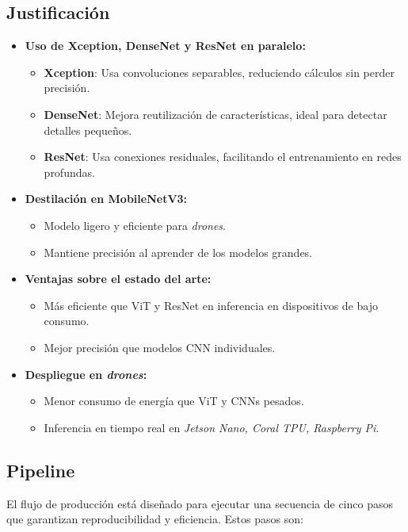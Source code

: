 \subsection{Justificación}

\begin{itemize}
    \item \textbf{Uso de Xception, DenseNet y ResNet en paralelo:}
    \begin{itemize}
        \item \textbf{Xception}: Usa convoluciones separables, reduciendo cálculos sin perder precisión.
        \item \textbf{DenseNet}: Mejora reutilización de características, ideal para detectar detalles pequeños.
        \item \textbf{ResNet}: Usa conexiones residuales, facilitando el entrenamiento en redes profundas.
    \end{itemize}
    \item \textbf{Destilación en MobileNetV3:}
    \begin{itemize}
        \item Modelo ligero y eficiente para \textit{drones}.
        \item Mantiene precisión al aprender de los modelos grandes.
    \end{itemize}
    \item \textbf{Ventajas sobre el estado del arte:}
    \begin{itemize}
        \item Más eficiente que ViT y ResNet en inferencia en dispositivos de bajo consumo.
        \item Mejor precisión que modelos CNN individuales.
    \end{itemize}
    \item \textbf{Despliegue en \textit{drones}:}
    \begin{itemize}
        \item Menor consumo de energía que ViT y CNNs pesados.
        \item Inferencia en tiempo real en \textit{Jetson Nano, Coral TPU, Raspberry Pi}.
    \end{itemize}

\end{itemize}

\subsection{Pipeline}
El flujo de producción está diseñado para ejecutar una secuencia de cinco pasos que garantizan reproducibilidad y eficiencia. Estos pasos son:

